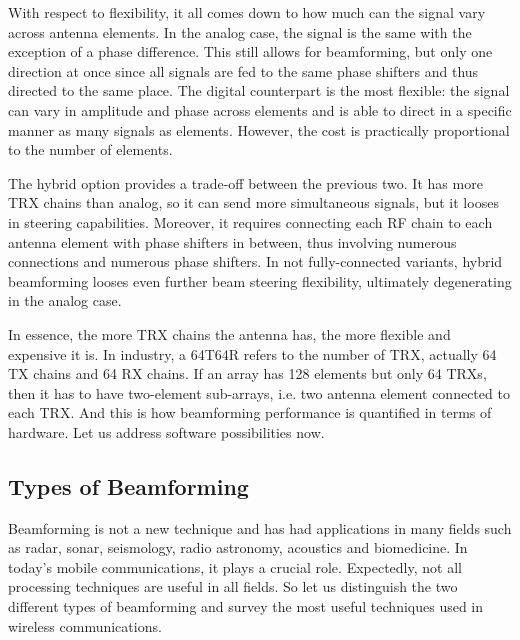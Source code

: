 With respect to flexibility, it all comes down to how much can the signal vary across antenna elements. In the analog case, the signal is the same with the exception of a phase difference. This still allows for beamforming, but only one direction at once since all signals are fed to the same phase shifters and thus directed to the same place. The digital counterpart is the most flexible: the signal can vary in amplitude and phase across elements and is able to direct in a specific manner as many signals as elements. However, the cost is practically proportional to the number of elements. 

The hybrid option provides a trade-off between the previous two. It has more TRX chains than analog, so it can send more simultaneous signals, but it looses in steering capabilities. Moreover, it requires connecting each RF chain to each antenna element with phase shifters in between, thus involving numerous connections and numerous phase shifters. In not fully-connected variants, hybrid beamforming looses even further beam steering flexibility, ultimately degenerating in the analog case.


In essence, the more TRX chains the antenna has, the more flexible and expensive it is. In industry, a 64T64R refers to the number of TRX, actually 64 TX chains and 64 RX chains. If an array has 128 elements but only 64 \acsp{TRX}, then it has to have two-element sub-arrays, i.e. two antenna element connected to each TRX. And this is how beamforming performance is quantified in terms of hardware. Let us address software possibilities now.


\subsection*{Types of Beamforming} \label{sec:types_of_beamforming}

Beamforming is not a new technique \cite{6591907} and has had applications in many fields such as radar, sonar, seismology, radio astronomy, acoustics and biomedicine. In today's mobile communications, it plays a crucial role. Expectedly, not all processing techniques are useful in all fields. So let us distinguish the two different types of beamforming and survey the most useful techniques used in wireless communications.


